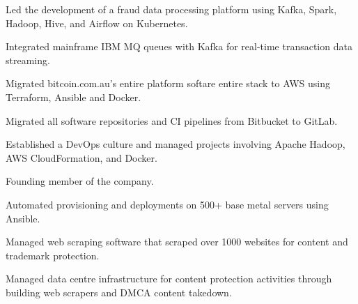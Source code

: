 \documentclass[]{resume}
\begin{document}
\begin{minipage}[t]{0.60\textwidth}
\begin{tightemize}
\item Led the development of a fraud data processing platform using Kafka, Spark, Hadoop, Hive, and Airflow on Kubernetes.
\item Integrated mainframe IBM MQ queues with Kafka for real-time transaction data streaming.
\end{tightemize}
\sectionsep

\begin{tightemize}
\item Migrated bitcoin.com.au's entire platform softare entire stack to AWS using Terraform, Ansible and Docker.
\item Migrated all software repositories and CI pipelines from Bitbucket to GitLab.
\end{tightemize}
\sectionsep

\begin{tightemize}
\item Established a DevOps culture and managed projects involving Apache Hadoop, AWS CloudFormation, and Docker.
\end{tightemize}
\sectionsep

\begin{tightemize}
\item Founding member of the company.
\item Automated provisioning and deployments on 500+ base metal servers using Ansible.
\item Managed web scraping software that scraped over 1000 websites for content and trademark protection.
\end{tightemize}
\sectionsep

\begin{tightemize}
\item Managed data centre infrastructure for content protection activities through building web scrapers and DMCA content takedown.
\end{tightemize}
\sectionsep

%
%

\end{minipage}
\end{document}
